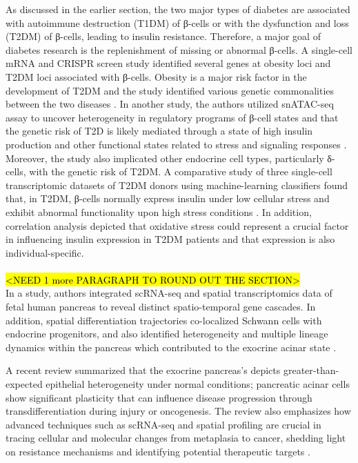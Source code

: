 As discussed in the earlier section, the two major types of diabetes are associated with autoimmune destruction (T1DM) of β-cells or with the dysfunction and loss (T2DM) of β-cells, leading to insulin resistance. Therefore, a major goal of diabetes research is the replenishment of missing or abnormal β-cells. A single-cell mRNA and CRISPR screen study identified several genes at obesity loci and T2DM loci associated with β-cells. Obesity is a major risk factor in the development of T2DM and the study identified various genetic commonalities between the two diseases \textbf{\cite{fang_single-cell_2019}}. In another study, the authors utilized snATAC-seq assay to uncover heterogeneity in regulatory programs of β-cell states and that the genetic risk of T2D is likely mediated through a state of high insulin production and other functional states related to stress and signaling responses \textbf{\cite{chiou_single-cell_2021}}. Moreover, the study also implicated other endocrine cell types, particularly δ-cells, with the genetic risk of T2DM. A comparative study of three single-cell transcriptomic datasets of T2DM donors using machine-learning classifiers found that, in T2DM, β-cells normally express insulin under low cellular stress and exhibit abnormal functionality upon high stress conditions \textbf{\cite{ma_single-cell_2018}}. In addition, correlation analysis depicted that oxidative stress could represent a crucial factor in influencing insulin expression in T2DM patients and that expression is also individual-specific. 
\\\\
\hl{<NEED 1 more PARAGRAPH TO ROUND OUT THE SECTION>}\\
In a study, authors integrated scRNA-seq and spatial transcriptomics data of fetal human pancreas to reveal distinct spatio-temporal gene cascades. In addition, spatial differentiation trajectories co-localized Schwann cells with endocrine progenitors, and also identified heterogeneity and multiple lineage dynamics within the pancreas which contributed to the exocrine acinar state \textbf{\cite{olaniru_single-cell_2023}}.

A recent review summarized that the exocrine pancreas's depicts greater-than-expected epithelial heterogeneity under normal conditions; pancreatic acinar cells show significant plasticity that can influence disease progression through transdifferentiation during injury or oncogenesis. The review also emphasizes how advanced techniques such as scRNA-seq and spatial profiling are crucial in tracing cellular and molecular changes from metaplasia to cancer, shedding light on resistance mechanisms and identifying potential therapeutic targets \textbf{\cite{cephas_it_2023}}.


